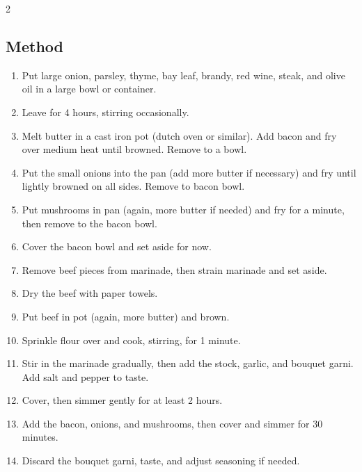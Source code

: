 \begin{multicols}{2}
      \vfill\null
    \columnbreak
    \subsection{Method}
      \begin{enumerate}
        \item Put large onion, parsley, thyme, bay leaf, brandy, red wine, steak, and olive oil in a large bowl or container.
        \item Leave for 4 hours, stirring occasionally.
        \item Melt butter in a cast iron pot (dutch oven or similar). Add bacon and fry over medium heat until browned. Remove to a bowl.
        \item Put the small onions into the pan (add more butter if necessary) and fry until lightly browned on all sides. Remove to bacon bowl.
        \item Put mushrooms in pan (again, more butter if needed) and fry for a minute, then remove to the bacon bowl.
        \item Cover the bacon bowl and set aside for now.
        \item Remove beef pieces from marinade, then strain marinade and set aside.
        \item Dry the beef with paper towels.
        \item Put beef in pot (again, more butter) and brown.
        \item Sprinkle flour over and cook, stirring, for 1 minute.
        \item Stir in the marinade gradually, then add the stock, garlic, and bouquet garni. Add salt and pepper to taste.
        \item Cover, then simmer gently for at least 2 hours.
        \item Add the bacon, onions, and mushrooms, then cover and simmer for 30 minutes.
        \item Discard the bouquet garni, taste, and adjust seasoning if needed.
      \end{enumerate}
    \end{multicols}
